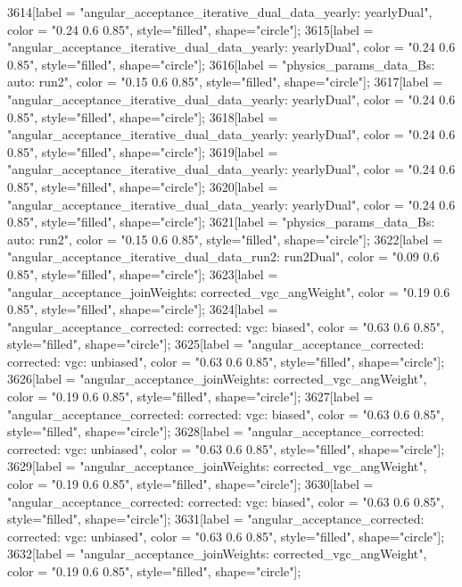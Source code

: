 {	3614[label = "angular_acceptance_iterative_dual_data_yearly\nangacc: yearlyDual", color = "0.24 0.6 0.85", style="filled", shape="circle"];
	3615[label = "angular_acceptance_iterative_dual_data_yearly\nangacc: yearlyDual", color = "0.24 0.6 0.85", style="filled", shape="circle"];
	3616[label = "physics_params_data_Bs\nfit: auto\nyear: run2", color = "0.15 0.6 0.85", style="filled", shape="circle"];
	3617[label = "angular_acceptance_iterative_dual_data_yearly\nangacc: yearlyDual", color = "0.24 0.6 0.85", style="filled", shape="circle"];
	3618[label = "angular_acceptance_iterative_dual_data_yearly\nangacc: yearlyDual", color = "0.24 0.6 0.85", style="filled", shape="circle"];
	3619[label = "angular_acceptance_iterative_dual_data_yearly\nangacc: yearlyDual", color = "0.24 0.6 0.85", style="filled", shape="circle"];
	3620[label = "angular_acceptance_iterative_dual_data_yearly\nangacc: yearlyDual", color = "0.24 0.6 0.85", style="filled", shape="circle"];
	3621[label = "physics_params_data_Bs\nfit: auto\nyear: run2", color = "0.15 0.6 0.85", style="filled", shape="circle"];
	3622[label = "angular_acceptance_iterative_dual_data_run2\nangacc: run2Dual", color = "0.09 0.6 0.85", style="filled", shape="circle"];
	3623[label = "angular_acceptance_joinWeights\nwflag: corrected_vgc_angWeight", color = "0.19 0.6 0.85", style="filled", shape="circle"];
	3624[label = "angular_acceptance_corrected\nangacc: corrected\ncsp: vgc\ntrigger: biased", color = "0.63 0.6 0.85", style="filled", shape="circle"];
	3625[label = "angular_acceptance_corrected\nangacc: corrected\ncsp: vgc\ntrigger: unbiased", color = "0.63 0.6 0.85", style="filled", shape="circle"];
	3626[label = "angular_acceptance_joinWeights\nwflag: corrected_vgc_angWeight", color = "0.19 0.6 0.85", style="filled", shape="circle"];
	3627[label = "angular_acceptance_corrected\nangacc: corrected\ncsp: vgc\ntrigger: biased", color = "0.63 0.6 0.85", style="filled", shape="circle"];
	3628[label = "angular_acceptance_corrected\nangacc: corrected\ncsp: vgc\ntrigger: unbiased", color = "0.63 0.6 0.85", style="filled", shape="circle"];
	3629[label = "angular_acceptance_joinWeights\nwflag: corrected_vgc_angWeight", color = "0.19 0.6 0.85", style="filled", shape="circle"];
	3630[label = "angular_acceptance_corrected\nangacc: corrected\ncsp: vgc\ntrigger: biased", color = "0.63 0.6 0.85", style="filled", shape="circle"];
	3631[label = "angular_acceptance_corrected\nangacc: corrected\ncsp: vgc\ntrigger: unbiased", color = "0.63 0.6 0.85", style="filled", shape="circle"];
	3632[label = "angular_acceptance_joinWeights\nwflag: corrected_vgc_angWeight", color = "0.19 0.6 0.85", style="filled", shape="circle"];
}

